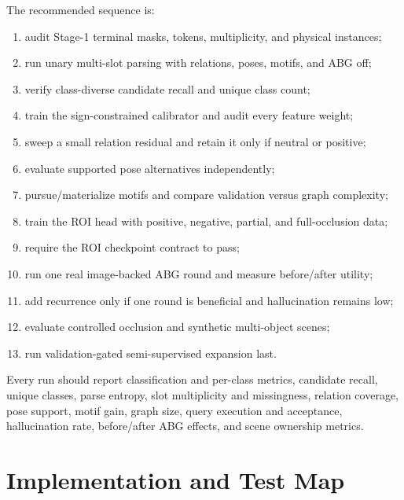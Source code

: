 \documentclass[11pt]{article}
\begin{document}
The recommended sequence is:

\begin{enumerate}[leftmargin=*]
  \item audit Stage-1 terminal masks, tokens, multiplicity, and physical instances;
  \item run unary multi-slot parsing with relations, poses, motifs, and ABG off;
  \item verify class-diverse candidate recall and unique class count;
  \item train the sign-constrained calibrator and audit every feature weight;
  \item sweep a small relation residual and retain it only if neutral or positive;
  \item evaluate supported pose alternatives independently;
  \item pursue/materialize motifs and compare validation versus graph complexity;
  \item train the ROI head with positive, negative, partial, and full-occlusion data;
  \item require the ROI checkpoint contract to pass;
  \item run one real image-backed ABG round and measure before/after utility;
  \item add recurrence only if one round is beneficial and hallucination remains low;
  \item evaluate controlled occlusion and synthetic multi-object scenes;
  \item run validation-gated semi-supervised expansion last.
\end{enumerate}

Every run should report classification and per-class metrics, candidate recall,
unique classes, parse entropy, slot multiplicity and missingness, relation
coverage, pose support, motif gain, graph size, query execution and acceptance,
hallucination rate, before/after ABG effects, and scene ownership metrics.

\section{Implementation and Test Map}
\end{document}
